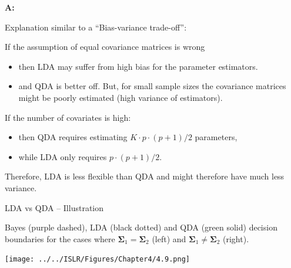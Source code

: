\documentclass[10pt,ignorenonframetext,]{beamer}
\providecommand{\tightlist}{%
  \setlength{\itemsep}{0pt}\setlength{\parskip}{0pt}}
\begin{document}
\begin{frame}

\textbf{A:}

Explanation similar to a ``Bias-variance trade-off'':

If the assumption of equal covariance matrices is wrong

\begin{itemize}
\tightlist
\item
  then LDA may suffer from high bias for the parameter estimators.
\item
  and QDA is better off. But, for small sample sizes the covariance
  matrices might be poorly estimated (high variance of estimators).
\end{itemize}

If the number of covariates is high:

\begin{itemize}
\tightlist
\item
  then QDA requires estimating \(K\cdot p \cdot (p+1)/2\) parameters,
\item
  while LDA only requires \(p\cdot(p+1)/2\).
\end{itemize}

Therefore, LDA is less flexible than QDA and might therefore have much
less variance.

\end{frame}

\begin{frame}

\begin{block}{LDA vs QDA -- Illustration}

Bayes (purple dashed), LDA (black dotted) and QDA (green solid) decision
boundaries for the cases where
\(\boldsymbol{\Sigma}_1 = \boldsymbol{\Sigma}_2\) (left) and
\(\boldsymbol{\Sigma}_1 \neq \boldsymbol{\Sigma}_2\) (right).

\centering
\texttt{[image: ../../ISLR/Figures/Chapter4/4.9.png]}

\end{block}

\end{frame}
\end{document}
